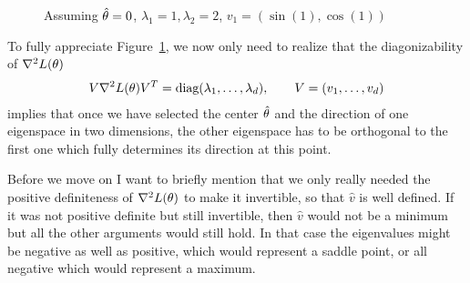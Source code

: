 %
\begin{wrapfigure}{O}{0.65\textwidth}
	\centering
	\def\svgwidth{0.65\textwidth}
	
	\caption{Assuming \(\hat{\theta}=0\), \(\lambda_1=1, \lambda_2=2\), \(v_1=(\sin(1), \cos(1))\)}
	\label{fig: 2d paraboloid}
\end{wrapfigure}
%
To fully appreciate Figure~\ref{fig: 2d paraboloid}, we now only need to realize
that the diagonizability of \(\nabla^2 L(\theta)\)
%
\begin{align}\label{eq: diagnalization of the Hesse matrix}
	V \nabla^2 L(\theta) V^T
	= \text{diag}(\lambda_1,\dots,\lambda_d), \qquad V=(v_1,\dots, v_d)
\end{align}
%
implies that once we have selected the center \(\hat{\theta}\) and the direction of
one eigenspace in two dimensions, the other eigenspace has to be
orthogonal to the first one which fully determines its direction at this point. 

Before we move on I want to briefly mention that we only really needed the
positive definiteness of \(\nabla^2 L(\theta)\) to make it invertible, so that
\(\hat{v}\) is well defined. If it was not positive definite but still invertible,
then \(\hat{v}\) would not be a minimum but all the other arguments would still
hold.
In that case the eigenvalues might be negative as well as positive, which would
represent a saddle point, or all negative which would represent a maximum.


